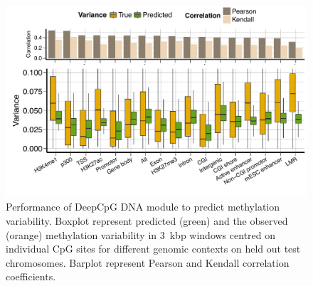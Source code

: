 \begin{figure}[htbp!]
\centering
\includegraphics[width=1.0\textwidth]{var_var}
\caption[Performance of DeepCpG DNA module to predict methylation variability.]{Performance of DeepCpG DNA module to predict methylation variability. Boxplot represent predicted (green) and the observed (orange) methylation variability in 3~kbp windows centred on individual CpG sites for different genomic contexts on held out test chromosomes. Barplot represent Pearson and Kendall correlation coefficients.}
\label{fig:dcpg_var_var}
\end{figure}

